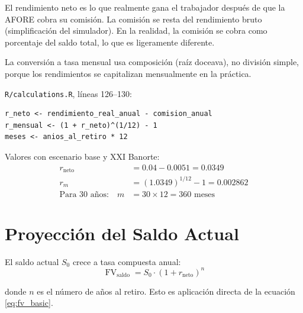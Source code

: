 \documentclass[11pt,a4paper]{report}
\theoremstyle{remark}
\DeclareMathOperator{\FV}{FV}
\begin{document}
\begin{tcolorbox}[colback=green!5!white, colframe=green!50!black, title=\textbf{Intuici\'on}]
El rendimiento neto es lo que realmente gana el trabajador despu\'es de que la AFORE cobra su comisi\'on. La comisi\'on se resta del rendimiento bruto (simplificaci\'on del simulador). En la realidad, la comisi\'on se cobra como porcentaje del saldo total, lo que es ligeramente diferente.

La conversi\'on a tasa mensual usa composici\'on (ra\'iz doceava), no divisi\'on simple, porque los rendimientos se capitalizan mensualmente en la pr\'actica.
\end{tcolorbox}

\begin{tcolorbox}[colback=orange!5!white, colframe=orange!75!black, title=\textbf{Aplicaci\'on en C\'odigo}]
\texttt{R/calculations.R}, l\'ineas 126--130:
\begin{lstlisting}
r_neto <- rendimiento_real_anual - comision_anual
r_mensual <- (1 + r_neto)^(1/12) - 1
meses <- anios_al_retiro * 12
\end{lstlisting}

Valores con escenario base y XXI Banorte:
\begin{align*}
r_{\text{neto}} &= 0.04 - 0.0051 = 0.0349 \\
r_m &= (1.0349)^{1/12} - 1 = 0.002862 \\
\text{Para 30 a\~nos:} \quad m &= 30 \times 12 = 360 \text{ meses}
\end{align*}
\end{tcolorbox}

\section{Proyecci\'on del Saldo Actual}

\begin{tcolorbox}[colback=blue!5!white, colframe=blue!75!black, title=\textbf{Definici\'on Formal}]
El saldo actual $S_0$ crece a tasa compuesta anual:
\begin{equation}
\FV_{\text{saldo}} = S_0 \cdot (1 + r_{\text{neto}})^n
\label{eq:fv_saldo}
\end{equation}

donde $n$ es el n\'umero de a\~nos al retiro. Esto es aplicaci\'on directa de la ecuaci\'on \eqref{eq:fv_basic}.
\end{tcolorbox}
\end{document}
